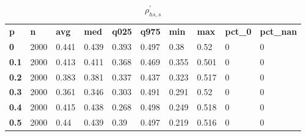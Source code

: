 \begin{table}[h]
 \centering 
\footnotesize
\caption{$\rho_{hs,s}^\prime $}
\label{tab:alphahss}
\begin{tabular}[h]{| l l l l l l l l l l|
    } \hline
\textbf{ p} & \textbf{ n} & \textbf{ avg} & \textbf{ med} & \textbf{ q025} & \textbf{ q975} & \textbf{ min} & \textbf{ max} & \textbf{ pct\_0} & \textbf{ pct\_nan}
           \\
  \textbf{  0} & 2000 & 0.441 & 0.439 & 0.393 & 0.497 &  0.38 &  0.52 & 0 & 0
           \\
  \textbf{0.1} & 2000 & 0.413 & 0.411 & 0.368 & 0.469 & 0.355 & 0.501 & 0 & 0
           \\
  \textbf{0.2} & 2000 & 0.383 & 0.381 & 0.337 & 0.437 & 0.323 & 0.517 & 0 & 0
           \\
  \textbf{0.3} & 2000 & 0.361 & 0.346 & 0.303 & 0.491 & 0.291 &  0.52 & 0 & 0
           \\
  \textbf{0.4} & 2000 & 0.415 & 0.438 & 0.268 & 0.498 & 0.249 & 0.518 & 0 & 0
           \\
  \textbf{0.5} & 2000 &  0.44 & 0.439 &  0.39 & 0.497 & 0.219 & 0.516 & 0 & 0
           \\
 \hline \end{tabular}
 \end{table}
